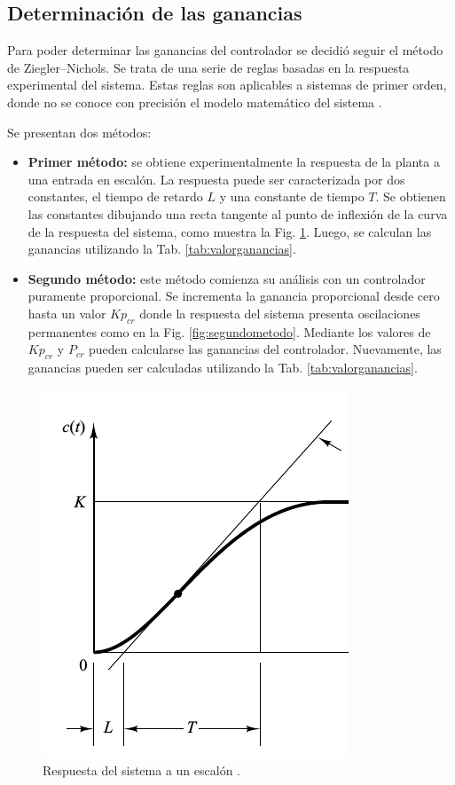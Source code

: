 \subsection{Determinación de las ganancias}

Para poder determinar las ganancias del controlador se decidió seguir el método
de Ziegler–Nichols.
Se trata de una serie de reglas basadas en la respuesta experimental
del sistema.
Estas reglas son aplicables a sistemas de primer orden, donde no se conoce con
precisión el modelo matemático del sistema \cite{bib:Ogata}.

Se presentan dos métodos:
\begin{itemize}
 \item \textbf{Primer método:} se obtiene experimentalmente la respuesta de la
planta a una entrada en escalón.
 La respuesta puede ser caracterizada por dos constantes, el tiempo de retardo
$L$ y una constante de tiempo $T$.
Se obtienen las constantes dibujando
una recta tangente al  punto de inflexión de la curva de la respuesta del
sistema, como muestra la Fig. \ref{fig:primermetodo}.
Luego, se calculan las ganancias utilizando la Tab. \ref{tab:valorganancias}.

 \item \textbf{Segundo método:}
 este método comienza su análisis con un controlador puramente proporcional.
 Se incrementa  la ganancia proporcional desde cero hasta un valor $Kp_{cr} $
donde la respuesta del  sistema presenta oscilaciones permanentes como en la
Fig. \ref{fig:segundometodo}.
 Mediante los valores de $Kp_{cr} $ y $P_{cr}$ pueden calcularse las ganancias
del controlador.
Nuevamente, las ganancias pueden ser calculadas utilizando la Tab.
\ref{tab:valorganancias}.
\end{itemize}

\begin{figure}[ht]
 \centering
 \includegraphics[scale=0.5]{Cap4-ProgramacionPLC/images/primermetodo.png}
 \caption{Respuesta del sistema a un escalón \cite{bib:Ogata}.}
 \label{fig:primermetodo}
\end{figure}

